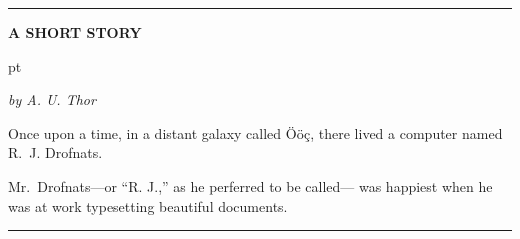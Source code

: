 \hrule
\vskip 1in
\centerline{\bf A SHORT STORY}
 pt
\centerline{\sl by A. U. Thor}
\vskip 0.5cm
Once upon a time, in a distant
	galaxy called \"O\"o\c c,
there lived a computer
named R.~J. Drofnats.

Mr.~Drofnats---or ``R. J.,'' as
he perferred to be called---%
was happiest when he was at work
typesetting beautiful documents.
\vskip 1in
\hrule
\vfill\eject


